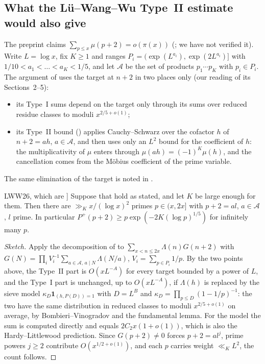 \subsection{What the L\"u--Wang--Wu Type~II estimate would also give}\label{subsec:lww-transfer}
The preprint \cite{LWW26} claims $\sum_{p\le x}\mu(p+2)=o(\pi(x))$ (; we
have not verified it). Write $L=\log x$, fix $K\ge1$ and ranges
$P_i=(\exp(L^{a_i}),\exp(2L^{a_i})]$ with $1/10<a_1<\dots<a_K<1/5$, and let
$\mathcal A$ be the set of products $p_1\cdots p_K$ with $p_i\in P_i$. The
argument of \cite{LWW26} uses the target at $n+2$ in two places only (our
reading of its Sections~2--5):
\begin{itemize}
\item its Type~I sums depend on the target only through its sums over reduced
  residue classes to moduli $x^{2/5+o(1)}$;
\item its Type~II bound (\cite[Prop.~4.2 with Prop.~5.3]{LWW26}) applies
  Cauchy--Schwarz over the cofactor $h$ of $n+2=ah$, $a\in\mathcal A$, and then uses
  only an $L^2$ bound for the coefficient of $h$: the multiplicativity of $\mu$
  enters through $\mu(ah)=(-1)^K\mu(h)$, and the cancellation comes from the
  M\"obius coefficient of the prime variable.
\end{itemize}
The same elimination of the target is noted in \cite[Remark~6.17]{Wan26}.

\begin{proposition}[\lbl{Proved here} in outline, conditional on \cite[Props.~4.2 and 5.3]{LWW26}, which are ]\label{prop:lww-transfer}
Suppose that \cite[Props.~4.2 and 5.3]{LWW26} hold as stated, and let $K$ be
large enough for them. Then there are $\gg_K x/(\log x)^2$ primes $p\in(x,2x]$
with $p+2=al$, $a\in\mathcal A$, $l$ prime. In particular
$P^+(p+2)\ge p\exp(-2K(\log p)^{1/5})$ for infinitely many $p$.
\end{proposition}

\begin{proof}[Sketch]
Apply the decomposition of \cite[Prop.~2.1]{LWW26} to
$\sum_{x<n\le2x}\Lambda(n)G(n+2)$ with
$G(N)=\prod_iV_i^{-1}\sum_{a\in\mathcal A,\,a\mid N}\Lambda(N/a)$,
$V_i=\sum_{p\in P_i}1/p$. By the two points above, the Type~II part is
$O(xL^{-A})$ for every target bounded by a power of $L$, and the Type~I part is
unchanged, up to $O(xL^{-A})$, if $\Lambda(h)$ is replaced by the sieve model
$\kappa_D\mathbf 1_{(h,P(D))=1}$ with $D=L^{B}$ and $\kappa_D=\prod_{p\le D}(1-1/p)^{-1}$:
the two have the same distribution in reduced classes to moduli
$x^{2/5+o(1)}$ on average, by Bombieri--Vinogradov and the fundamental lemma.
For the model the sum is computed directly and equals $2C_2x(1+o(1))$, which is
also the Hardy--Littlewood prediction. Since $G(p+2)\ne0$ forces $p+2=al^j$, prime
powers $j\ge2$ contribute $O(x^{1/2+o(1)})$, and each $p$ carries weight
$\ll_KL^2$, the count follows.
\end{proof}

